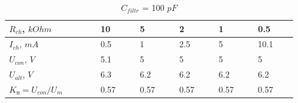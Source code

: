 \documentclass{article}
\begin{document}
\begin{normalsize}
	\begin{table}[H]
		\centering
		\renewcommand*\arraystretch{1.3}
		\begin{tabular}{|p{0.15\linewidth}|p{0.08\linewidth}|p{0.08\linewidth}|p{0.08\linewidth}|p{0.08\linewidth}|p{0.08\linewidth}|}
			\hline
			$R_{ch}$, $kOhm$& 10 & 5 & 2 & 1 & 0.5\\
			\hline
			$I_{ch}$, $mA$& 0.5 & 1 & 2.5 & 5 & 10.1\\
			\hline
			$U_{con}$, $V$& 5.1 & 5 & 5 & 5 & 5\\
			\hline
			$U_{alt}$, $V$& 6.3 & 6.2 & 6.2 & 6.2 &6.2\\
			\hline
			$K_\text{п}=U_{con}/U_{m}$& 0.57 & 0.57 & 0.57 & 0.57 & 0.57\\
			\hline
		\end{tabular}
		\caption{$C_{filtr}$ = 100 $pF$}
	\end{table}
	

\end{normalsize}
\end{document}

